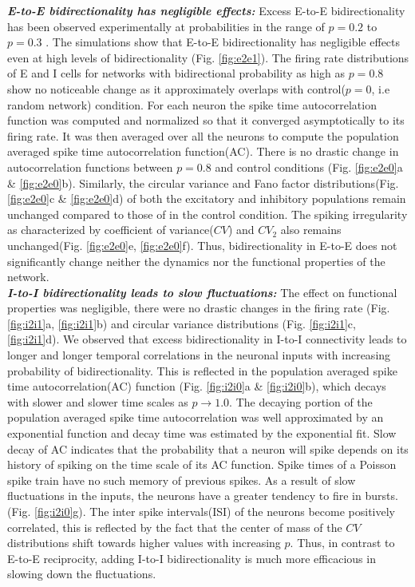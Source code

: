 \emph{\textbf{E-to-E bidirectionality has negligible effects:}} Excess E-to-E bidirectionality has been observed experimentally at probabilities in the range of $p = 0.2$ to $p = 0.3$ \cite{Song2005}. 
The simulations show that E-to-E bidirectionality has negligible effects even at high levels of bidirectionality (Fig. \ref{fig:e2e1}). The firing rate distributions of E and I cells for networks with bidirectional probability as high as $p = 0.8$ show no noticeable change as it approximately overlaps with control($p = 0$, i.e random network) condition. For each neuron the spike time autocorrelation function was computed and normalized so that it converged asymptotically to its firing rate. It was then averaged over all the neurons  to compute the population averaged spike time autocorrelation function(AC). There is no drastic change in autocorrelation functions between $p = 0.8$ and control conditions (Fig. \ref{fig:e2e0}a \& \ref{fig:e2e0}b). Similarly, the circular variance and Fano factor distributions(Fig. \ref{fig:e2e0}c \& \ref{fig:e2e0}d) of both the excitatory and inhibitory populations remain unchanged compared to those of in the control condition. The spiking irregularity as characterized by coefficient of variance($CV$) and $CV_2$ also remains unchanged(Fig. \ref{fig:e2e0}e, \ref{fig:e2e0}f). Thus, bidirectionality in E-to-E does not significantly change neither the dynamics nor the functional properties of the network.  \\

\emph{\textbf{I-to-I bidirectionality leads to slow fluctuations:}} The effect on functional properties was negligible, there were no drastic changes in the firing rate (Fig. \ref{fig:i2i1}a, \ref{fig:i2i1}b) and circular variance distributions (Fig. \ref{fig:i2i1}c, \ref{fig:i2i1}d). 
We observed that excess bidirectionality in I-to-I connectivity leads to longer and longer temporal correlations in the neuronal inputs with increasing probability of bidirectionality. This is reflected in the population averaged spike time autocorrelation(AC) function (Fig. \ref{fig:i2i0}a \& \ref{fig:i2i0}b), which decays with slower and slower time scales as $p \rightarrow 1.0$. The decaying portion of the population averaged spike time autocorrelation was well approximated by an exponential function and decay time was estimated by the exponential fit. Slow decay of AC indicates that the probability that a neuron will spike depends on its history of spiking on the time scale of its AC function. Spike times of a Poisson spike train have no such memory of previous spikes. As a result of slow fluctuations in the inputs, the neurons have a greater tendency to fire in bursts.(Fig. \ref{fig:i2i0}g). The inter spike intervals(ISI) of the neurons become positively correlated, this is reflected by the fact that the center of mass of the $CV$ distributions shift towards higher values with increasing $p$. Thus, in contrast to E-to-E reciprocity, adding I-to-I bidirectionality is much more efficacious in slowing down the fluctuations. \\
 
